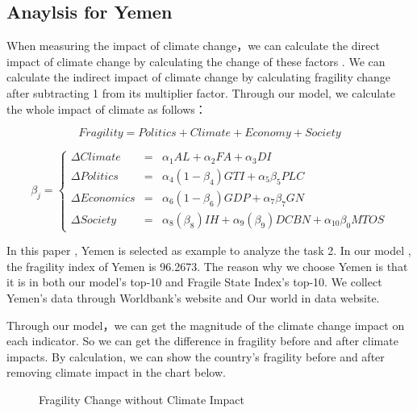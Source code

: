 \documentclass{mcmthesis}
\begin{document}
		\subsection{Anaylsis for Yemen}
			
			When measuring the impact of climate change，we can calculate the direct impact of climate change by calculating the change of these factors . We can calculate the indirect impact of climate change by calculating fragility change after subtracting 1 from its multiplier factor.
			Through our model, we calculate the whole impact of climate as follows：
			
			\begin{equation}
			Fragility =  Politics + Climate + Economy + Society
			\end{equation}
			
			$$ 
			\beta_{j}=\left\{
			\begin{array}{rcl}
			\Delta Climate& =& \alpha _ { 1 } A L + \alpha _ { 2 } F A + \alpha _ { 3 } D I\\
			\Delta Politics& =& \alpha _ { 4 } (1-\beta _ { 4 }) G T I + \alpha _ { 5 } \beta _ { 5 } P L C\\
			\Delta Economics& =& \alpha _ { 6 } (1-\beta _ { 6 }) G D P + \alpha _ { 7 } \beta _ { 7 } G N\\
			\Delta Society& =& \alpha _ { 8 } (\beta _ { 8 }) I H + \alpha _ { 9 } (\beta _ { 9 }) D C B N + \alpha _ { 10 } \beta _ { 0 } M T O S
			\end{array} \right. 
			$$
			
			In this paper , Yemen is selected as example to analyze the task 2. In our model , the fragility index of Yemen is 96.2673. The reason why we  choose Yemen is that it is in both our model’s top-10 and Fragile State Index’s top-10. We collect Yemen’s data through Worldbank’s website and Our world in data website.
			
			Through our model，we can get the magnitude of the climate change impact on each indicator. So we can get the difference in fragility before and after climate impacts. By calculation, we can show the country's fragility before and after removing climate impact in the chart below.
			
			\begin{figure}[htbp]
				\centering
				\centering
				\caption{Fragility Change without Climate Impact}
			\end{figure}
		
\end{document}
